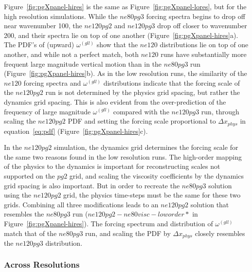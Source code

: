 \documentclass{agujournal}
\begin{document}
Figure~\ref{fig:pgXpanel-hires} is the same as Figure~\ref{fig:pgXpanel-lores}, but for the high resolution simulations. While the $ne80pg3$ forcing spectra begins to drop off near wavenumber 100, the $ne120pg2$ and $ne120pg3$ drop off closer to wavenumber 200, and their spectra lie on top of one another (Figure~\ref{fig:pgXpanel-hires}a). The PDF's of (upward) $\omega^{(gll)}$ show that the $ne120$ distributions lie on top of one another, and while not a perfect match, both $ne120$ runs have substantially more frequent large magnitude vertical motion than in the $ne80pg3$ run (Figure~\ref{fig:pgXpanel-hires}b). As in the low resolution runs, the similarity of the $ne120$ forcing spectra and $\omega^{(gll)}$ distributions indicate that the forcing scale of the $ne120pg2$ run is not determined by the physics grid spacing, but rather the dynamics grid spacing. This is also evident from the over-prediction of the frequency of large magnitude $\omega^{(gll)}$ compared with the $ne120pg3$ run, through scaling the $ne120pg2$ PDF and setting the forcing scale proportional to $\Delta x_{phys}$ in equation~\eqref{eq:pdf} (Figure~\ref{fig:pgXpanel-hires}c).

In the $ne120pg2$ simulation, the dynamics grid determines the forcing scale for the same two reasons found in the low resolution runs. The high-order mapping of the physics to the dynamics is important for reconstructing scales not supported on the $pg2$ grid, and scaling the viscosity coefficients by the dynamics grid spacing is also important. But in order to recreate the $ne80pg3$ solution using the $ne120pg2$ grid, the physics time-steps must be the same for these two grids. Combining all three modifications leads to an $ne120pg2$ solution that resembles the $ne80pg3$ run ($ne120pg2-ne80visc-loworder*$ in Figure~\ref{fig:pgXpanel-hires}). The forcing spectrum and distribution of $\omega^{(gll)}$ match that of the $ne80pg3$ run, and scaling the PDF by $\Delta x_{phys}$ closely resembles the $ne120pg3$ distribution.

\subsubsection{Across Resolutions}\label{sec:allres}
\end{document}
